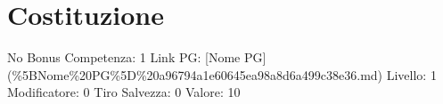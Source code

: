 \section{Costituzione}\label{costituzione}

\begin{description}
\tightlist
\item[Tags: STAT]
No Bonus Competenza: 1 Link PG: {[}Nome PG{]}
(\%5BNome\%20PG\%5D\%20a96794a1e60645ea98a8d6a499c38e36.md) Livello: 1
Modificatore: 0 Tiro Salvezza: 0 Valore: 10
\end{description}
